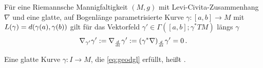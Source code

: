 \documentclass[../H_Analysis_main.tex]{subfiles}
\begin{document}
\begin{satz}
Für eine Riemannsche Mannigfaltigkeit $(M, g)$ mit Levi-Civita-Zusammenhang $\nabla$ und eine glatte, auf Bogenlänge parametrisierte Kurve $\gamma: [a, b] \rightarrow M$ mit $L(\gamma) = d\qty(\gamma(a), \gamma(b))$ gilt für das Vektorfeld $\gamma' \in \Gamma([a, b]; \gamma^* TM)$ längs $\gamma$
\begin{equation}\label{eq:geodgl}
\nabla_{\gamma'} \gamma' := \nabla_{\dv{t}} \gamma' := \qty(\gamma^* \nabla)_{\dv{t}} \gamma' = 0 \, .
\end{equation}
\end{satz}

\begin{defi}[Geodäte]
Eine glatte Kurve $\gamma: I \rightarrow M$, die \eqref{eq:geodgl} erfüllt, heißt .
\end{defi}
\end{document}
